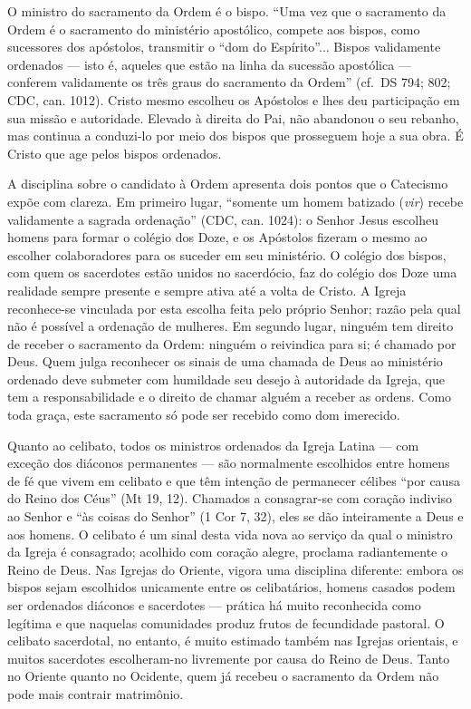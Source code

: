 O ministro do sacramento da Ordem é o bispo. ``Uma vez que o sacramento da Ordem é o sacramento do ministério apostólico, compete aos bispos, como sucessores dos apóstolos, transmitir o ``dom do Espírito''... Bispos validamente ordenados --- isto é, aqueles que estão na linha da sucessão apostólica --- conferem validamente os três graus do sacramento da Ordem'' (cf.~DS 794; 802; CDC, can. 1012). Cristo mesmo escolheu os Apóstolos e lhes deu participação em sua missão e autoridade. Elevado à direita do Pai, não abandonou o seu rebanho, mas continua a conduzi-lo por meio dos bispos que prosseguem hoje a sua obra. É Cristo que age pelos bispos ordenados.

A disciplina sobre o candidato à Ordem apresenta dois pontos que o Catecismo expõe com clareza. Em primeiro lugar, ``somente um homem batizado (\textit{vir}) recebe validamente a sagrada ordenação'' (CDC, can. 1024): o Senhor Jesus escolheu homens para formar o colégio dos Doze, e os Apóstolos fizeram o mesmo ao escolher colaboradores para os suceder em seu ministério. O colégio dos bispos, com quem os sacerdotes estão unidos no sacerdócio, faz do colégio dos Doze uma realidade sempre presente e sempre ativa até a volta de Cristo. A Igreja reconhece-se vinculada por esta escolha feita pelo próprio Senhor; razão pela qual não é possível a ordenação de mulheres. Em segundo lugar, ninguém tem direito de receber o sacramento da Ordem: ninguém o reivindica para si; é chamado por Deus. Quem julga reconhecer os sinais de uma chamada de Deus ao ministério ordenado deve submeter com humildade seu desejo à autoridade da Igreja, que tem a responsabilidade e o direito de chamar alguém a receber as ordens. Como toda graça, este sacramento só pode ser recebido como dom imerecido.

Quanto ao celibato, todos os ministros ordenados da Igreja Latina --- com exceção dos diáconos permanentes --- são normalmente escolhidos entre homens de fé que vivem em celibato e que têm intenção de permanecer célibes ``por causa do Reino dos Céus'' (Mt 19, 12). Chamados a consagrar-se com coração indiviso ao Senhor e ``às coisas do Senhor'' (1 Cor 7, 32), eles se dão inteiramente a Deus e aos homens. O celibato é um sinal desta vida nova ao serviço da qual o ministro da Igreja é consagrado; acolhido com coração alegre, proclama radiantemente o Reino de Deus. Nas Igrejas do Oriente, vigora uma disciplina diferente: embora os bispos sejam escolhidos unicamente entre os celibatários, homens casados podem ser ordenados diáconos e sacerdotes --- prática há muito reconhecida como legítima e que naquelas comunidades produz frutos de fecundidade pastoral. O celibato sacerdotal, no entanto, é muito estimado também nas Igrejas orientais, e muitos sacerdotes escolheram-no livremente por causa do Reino de Deus. Tanto no Oriente quanto no Ocidente, quem já recebeu o sacramento da Ordem não pode mais contrair matrimônio.

